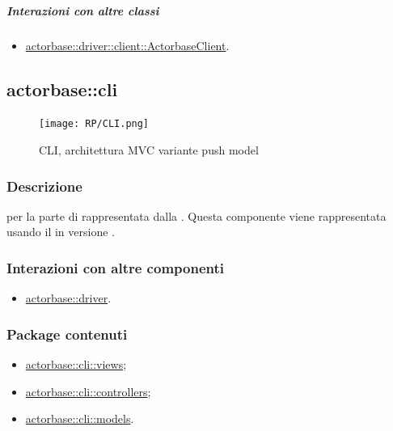 \documentclass{scalatekids-article}
\begin{document}
\subparagraph{Interazioni con altre classi}

\begin{itemize}
\item \hyperref[sec:actorbase::driver::client::ActorbaseClient]{actorbase::driver::client::ActorbaseClient}.
\end{itemize}


\subsection{actorbase::cli}
\label{sec:actorbase::cli}

\begin{figure}[H]
  \begin{center}
    \texttt{[image: RP/CLI.png]}
    \caption{CLI, architettura MVC variante push model}
  \end{center}
\end{figure}

\subsubsection{Descrizione}

 per la parte di  rappresentata dalla .
Questa componente viene rappresentata usando il 
 in versione .

\subsubsection{Interazioni con altre componenti}

\begin{itemize}
\item \hyperref[sec:actorbase::driver]{actorbase::driver}.
\end{itemize}

\subsubsection{Package contenuti}

\begin{itemize}
\item \hyperref[sec:actorbase::cli::views]{actorbase::cli::views};
\item \hyperref[sec:actorbase::cli::controllers]{actorbase::cli::controllers};
\item \hyperref[sec:actorbase::cli::models]{actorbase::cli::models}.
\end{itemize}
\end{document}

